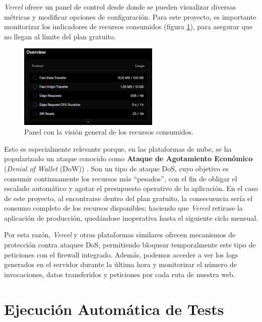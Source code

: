 \textit{Vercel} ofrece un panel de control desde donde se pueden visualizar diversas métricas y modificar opciones de configuración. Para este proyecto, es importante monitorizar los indicadores de recursos consumidos (figura \ref{fig:usage_overview}), para asegurar que no llegan al límite del plan gratuito.

\begin{figure}[H]
    \centering
    \includegraphics[width=0.6\textwidth]{figures/despliegue/usage_overview.png}
    \caption{Panel con la visión general de los recursos consumidos.}
    \label{fig:usage_overview}
\end{figure}

\newpage

Esto es especialmente relevante porque, en las plataformas de nube, se ha popularizado un ataque conocido como \textbf{Ataque de Agotamiento Económico} (\textit{Denial of Wallet} (DoW)) \cite{vercelDoW2025}. Son un tipo de ataque DoS, cuyo objetivo es consumir continuamente los recursos más ``pesados'', con el fin de obligar el escalado automático y agotar el presupuesto operativo de la aplicación. En el caso de este proyecto, al encontrarse dentro del plan gratuito, la consecuencia sería el consumo completo de los recursos disponibles; haciendo que \textit{Vercel} retirase la aplicación de producción, quedándose inoperativa hasta el siguiente ciclo mensual.

Por esta razón, \textit{Vercel} y otras plataformas similares ofrecen mecanismos de protección contra ataques DoS, permitiendo bloquear temporalmente este tipo de peticiones con el firewall integrado. Además, podemos acceder a ver los logs generados en el servidor durante la última hora y monitorizar el número de invocaciones, datos transferidos y peticiones por cada ruta de nuestra web.

\section{Ejecución Automática de Tests} \label{sec:test_automaticos}

